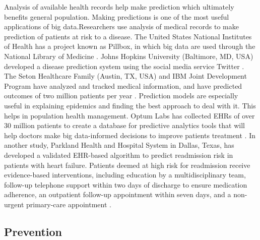 \documentclass[sigconf]{acmart}
\begin{document}
Analysis of available health records help make prediction which ultimately benefits general population. Making predictions is one of the most useful applications of big data.Researchers use analysis of medical records to make prediction of patients at risk to a disease. The United States National Institutes of Health has a project known as Pillbox, in which big data are used through the National Library of Medicine \cite{www-tandf-com}. Johns Hopkins University (Baltimore, MD, USA) developed a disease prediction system using the social media service Twitter \cite{www-ncbi-nlm-nih-gov}.
The Seton Healthcare Family (Austin, TX, USA) and IBM Joint Development Program have analyzed and tracked medical information, and have predicted outcomes of two million patients per
year \cite{www-uhcjsc-com}. Prediction models are especially useful in explaining epidemics and finding the best approach to deal with it. This helps in population health management. Optum Labs has collected EHRs of over 30 million patients to create a database for predictive analytics tools that will help doctors make big 
data-informed decisions to improve patients treatment \cite{www-mapr-com}. In another study, Parkland Health and Hospital System in Dallas, Texas, has developed a validated EHR-based algorithm to predict readmission risk in patients with heart failure. Patients deemed at high risk for readmission receive evidence-based interventions, including education by a multidisciplinary team, follow-up telephone support within two days of discharge to ensure medication adherence, an outpatient follow-up appointment within seven days, and a non-urgent primary-care appointment \cite{www-google-com}.


\subsection{Prevention}
\end{document}
